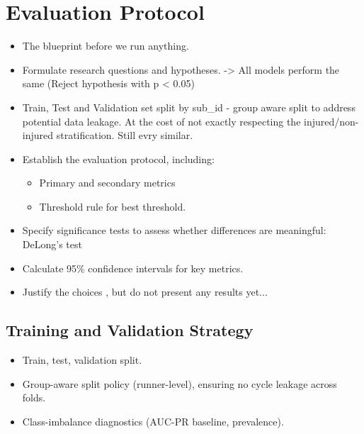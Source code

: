 \section{Evaluation Protocol}\label{sec:method-evaluation-protocol}

\begin{itemize}
    \item The blueprint before we run anything.
    \item Formulate research questions and hypotheses. -> All models perform the same (Reject hypothesis with p < 0.05)
    \item Train, Test and Validation set split by sub\_id - group aware split to address potential data leakage. At the cost of not exactly respecting the injured/non-injured stratification. Still evry similar.
    \item Establish the evaluation protocol, including:
    \begin{itemize}
        \item Primary and secondary metrics
        \item Threshold rule for best threshold.
    \end{itemize}
    \item Specify significance tests to assess whether differences are meaningful: DeLong's test
    \item Calculate 95\% confidence intervals for key metrics.
    \item Justify the choices , but do not present any results yet...
\end{itemize}


\subsection{Training and Validation Strategy}\label{subsec:method-training-validation-strategy}

\begin{itemize}
    \item Train, test, validation split.
    \item Group-aware split policy (runner-level), ensuring no cycle leakage across folds.
    \item Class-imbalance diagnostics (AUC-PR baseline, prevalence).
\end{itemize}

